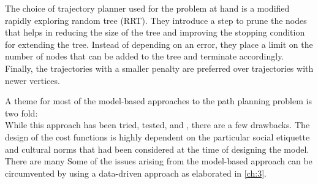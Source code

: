 The choice of trajectory planner used for the problem at hand is a modified rapidly exploring random tree (RRT). They introduce a step to prune the nodes that helps in reducing the size of the tree and improving the stopping condition for extending the tree. Instead of depending on an error, they place a limit on the number of nodes that can be added to the tree and terminate accordingly.  Finally, the trajectories with a smaller penalty are preferred over trajectories with newer vertices.

\par
A theme for most of the model-based approaches to the path planning problem is two fold: \\
While this approach has been tried, tested, and , there are a few drawbacks. The design of the cost functions is highly dependent on the particular social etiquette and cultural norms that had been considered at the time of designing the model. There are many  Some of the issues arising from the model-based approach can be circumvented by using a data-driven approach as elaborated in \autoref{ch:3}.












